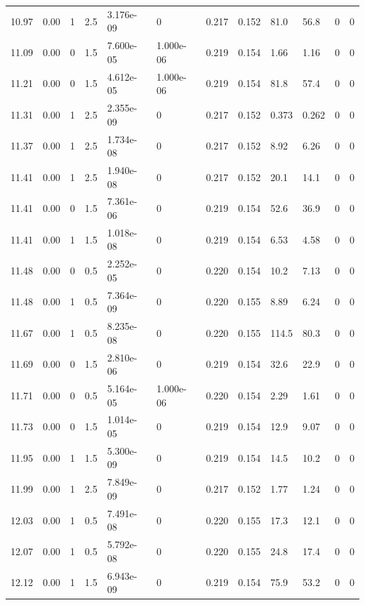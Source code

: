 \documentclass[preview]{standalone}
\begin{document}
{{{{{\begin{tabular}{L{1.2cm}C{1.2cm} C{0.3cm}C{0.5cm} C{1.4cm}C{1.4cm} C{1.4cm}C{1.4cm} C{1.6cm}C{1.6cm} C{1.6cm}C{1.6cm}}
  10.97  &  0.00  & 1     & 2.5 &  3.176e-09  & 0  &  0.217&   0.152& 81.0 & 56.8   &  0 & 0  \\ 
  11.09  &  0.00  & 0     & 1.5 &  7.600e-05  & 1.000e-06  &  0.219&   0.154& 1.66 & 1.16   &  0 & 0  \\ 
  11.21  &  0.00  & 0     & 1.5 &  4.612e-05  & 1.000e-06  &  0.219&   0.154& 81.8 & 57.4   &  0 & 0  \\ 
  11.31  &  0.00  & 1     & 2.5 &  2.355e-09  & 0  &  0.217&   0.152& 0.373 & 0.262   &  0 & 0  \\ 
  11.37  &  0.00  & 1     & 2.5 &  1.734e-08  & 0  &  0.217&   0.152& 8.92 & 6.26   &  0 & 0  \\ 
  11.41  &  0.00  & 1     & 2.5 &  1.940e-08  & 0  &  0.217&   0.152& 20.1 & 14.1   &  0 & 0  \\ 
  11.41  &  0.00  & 0     & 1.5 &  7.361e-06  & 0  &  0.219&   0.154& 52.6 & 36.9   &  0 & 0  \\ 
  11.41  &  0.00  & 1     & 1.5 &  1.018e-08  & 0  &  0.219&   0.154& 6.53 & 4.58   &  0 & 0  \\ 
  11.48  &  0.00  & 0     & 0.5 &  2.252e-05  & 0  &  0.220&   0.154& 10.2 & 7.13   &  0 & 0  \\ 
  11.48  &  0.00  & 1     & 0.5 &  7.364e-09  & 0  &  0.220&   0.155& 8.89 & 6.24   &  0 & 0  \\ 
  11.67  &  0.00  & 1     & 0.5 &  8.235e-08  & 0  &  0.220&   0.155& 114.5 & 80.3   &  0 & 0  \\ 
  11.69  &  0.00  & 0     & 1.5 &  2.810e-06  & 0  &  0.219&   0.154& 32.6 & 22.9   &  0 & 0  \\ 
  11.71  &  0.00  & 0     & 0.5 &  5.164e-05  & 1.000e-06  &  0.220&   0.154& 2.29 & 1.61   &  0 & 0  \\ 
  11.73  &  0.00  & 0     & 1.5 &  1.014e-05  & 0  &  0.219&   0.154& 12.9 & 9.07   &  0 & 0  \\ 
  11.95  &  0.00  & 1     & 1.5 &  5.300e-09  & 0  &  0.219&   0.154& 14.5 & 10.2   &  0 & 0  \\ 
  11.99  &  0.00  & 1     & 2.5 &  7.849e-09  & 0  &  0.217&   0.152& 1.77 & 1.24   &  0 & 0  \\ 
  12.03  &  0.00  & 1     & 0.5 &  7.491e-08  & 0  &  0.220&   0.155& 17.3 & 12.1   &  0 & 0  \\ 
  12.07  &  0.00  & 1     & 0.5 &  5.792e-08  & 0  &  0.220&   0.155& 24.8 & 17.4   &  0 & 0  \\ 
  12.12  &  0.00  & 1     & 1.5 &  6.943e-09  & 0  &  0.219&   0.154& 75.9 & 53.2   &  0 & 0  \\ 

\end{tabular}}}}}}
\end{document}
